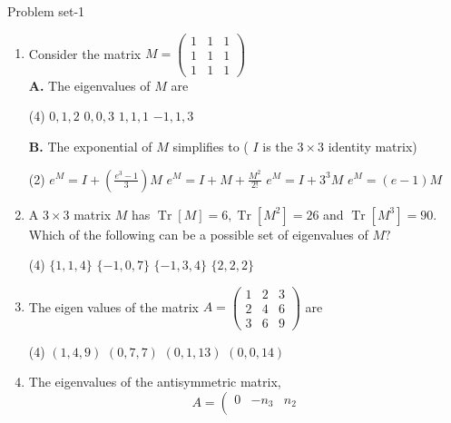 \begin{abox}
	Problem set-1
	\end{abox}
\begin{enumerate}[label=\color{ocre}\textbf{\arabic*.}]
	\item Consider the matrix $M=\left(\begin{array}{lll}1 & 1 & 1 \\ 1 & 1 & 1 \\ 1 & 1 & 1\end{array}\right)$\\
	\textbf{A.} The eigenvalues of $M$ are
	{}
	\begin{tasks}(4)
		\task[\textbf{A.}] $0,1,2$
		\task[\textbf{B.}] $0,0,3$
		\task[\textbf{C.}] $1,1,1$
		\task[\textbf{D.}] $-1,1,3$
	\end{tasks}
	\textbf{B.} The exponential of $M$ simplifies to ( $I$ is the $3 \times 3$ identity matrix)
	\begin{tasks}(2)
		\task[\textbf{A.}] $e^{M}=I+\left(\frac{e^{3}-1}{3}\right) M$
		\task[\textbf{B.}] $e^{M}=I+M+\frac{M^{2}}{2 !}$
		\task[\textbf{C.}] $e^{M}=I+3^{3} M$
		\task[\textbf{D.}] $e^{M}=(e-1) M$
	\end{tasks}
	\item A $3 \times 3$ matrix $M$ has $\operatorname{Tr}[M]=6, \operatorname{Tr}\left[M^{2}\right]=26$ and $\operatorname{Tr}\left[M^{3}\right]=90$. Which of the following can be a possible set of eigenvalues of $M ?$
	{}
	\begin{tasks}(4)
		\task[\textbf{A.}] $\{1,1,4\}$
		\task[\textbf{B.}] $\{-1,0,7\}$
		\task[\textbf{C.}] $\{-1,3,4\}$
		\task[\textbf{D.}] $\{2,2,2\}$
	\end{tasks}
	\item The eigen values of the matrix $A=\left(\begin{array}{lll}1 & 2 & 3 \\ 2 & 4 & 6 \\ 3 & 6 & 9\end{array}\right)$ are
	{}
	\begin{tasks}(4)
		\task[\textbf{A.}] $(1,4,9)$
		\task[\textbf{B.}] $(0,7,7)$
		\task[\textbf{C.}] $(0,1,13)$
		\task[\textbf{D.}] $(0,0,14)$
	\end{tasks}
	\item The eigenvalues of the antisymmetric matrix,
	$$
	A=\left(\begin{array}{ccc}
	0 & -n_{3} & n_{2} \\

\end{array}$$
\end{enumerate}
